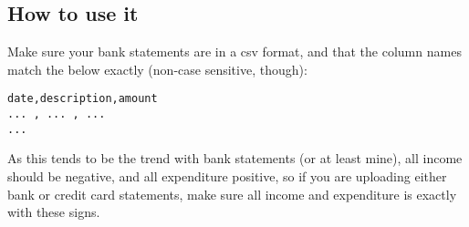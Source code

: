 \subsection{How to use it}
Make sure your bank statements are in a csv format, and that the column names
match the below exactly (non-case sensitive, though):
\begin{lstlisting}
date,description,amount
... , ... , ...
...
\end{lstlisting}

As this tends to be the trend with bank statements (or at least mine), all
income should be negative, and all expenditure positive, so if you are
uploading either bank or credit card statements, make sure all income and
expenditure is exactly with these signs.
